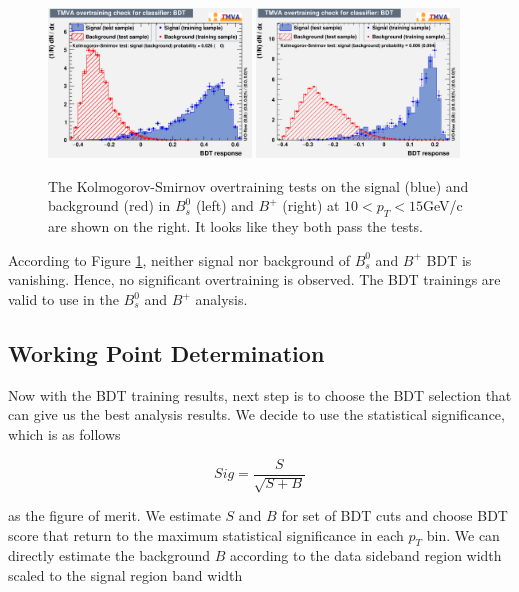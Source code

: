 \begin{figure}[h]
\begin{center}
\includegraphics[width= 0.48\textwidth]{Figures/Chapter4/BsOT.eps}
\includegraphics[width= 0.48\textwidth]{Figures/Chapter4/BPOT.pdf}
\caption{The Kolmogorov-Smirnov overtraining tests on the signal (blue) and background (red) in $B^0_s$ (left) and $B^+$ (right) at $10 < p_T < 15$GeV/c are shown on the right. It looks like they both pass the tests.}
\label{OverTraining}
\end{center}
\end{figure}

According to Figure \ref{OverTraining}, neither signal nor background of $B^0_s$ and $B^+$ BDT is vanishing. Hence, no significant overtraining is observed. The BDT trainings are valid to use in the $B^0_s$ and $B^+$ analysis.


\subsection{Working Point Determination}

Now with the BDT training results, next step is to choose the BDT selection that can give us the best analysis results. We decide to use the statistical significance, which is as follows

\begin{equation}
Sig = \frac{S}{\sqrt{S+B}}
\end{equation}

as the figure of merit. We estimate $S$ and $B$ for set of BDT cuts and choose BDT score that return to the maximum statistical significance in each $p_T$ bin. We can directly estimate the background $B$ according to the data sideband region width scaled to the signal region band width

